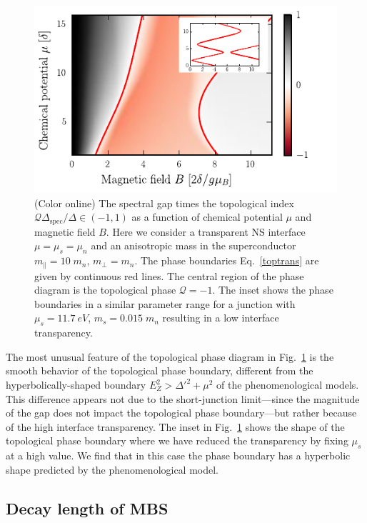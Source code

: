 \begin{figure}
\includegraphics[width=\columnwidth]{chapter_shortjunction/figures/gaps}
\caption{(Color online) The spectral gap times the topological index $\mathcal Q \Delta_\mathrm{spec} /\Delta \in(-1,1)$ as a function of chemical potential $\mu$ and magnetic field $B$.
Here we consider a transparent NS interface $\mu=\mu_s=\mu_n$ and an anisotropic mass in the superconductor $m_\parallel=10\;m_n$, $m_\perp = m_n$.
The phase boundaries Eq.~\eqref{toptrans} are given by continuous red lines.
The central region of the phase diagram is the topological phase $\mathcal Q=-1$.
The inset shows the phase boundaries in a similar parameter range for a junction with $\mu_s=\SI{11.7}{eV}$, $m_s=0.015\;m_n$ resulting in a low interface transparency.
}
\label{fig:gaps}
\end{figure}

The most unusual feature of the topological phase diagram in Fig.~\ref{fig:gaps} is the smooth behavior of the topological phase boundary, different from the hyperbolically-shaped boundary $E_Z^2 > \Delta'^2 + \mu^2$ of the phenomenological models\cite{Lutchyn2010,Oreg2010,Lutchyn2011}.
This difference appears not due to the short-junction limit---since the magnitude of the gap does not impact the topological phase boundary---but rather because of the high interface transparency.
The inset in Fig.~\ref{fig:gaps} shows the shape of the topological phase boundary where we have reduced the transparency by fixing $\mu_s$ at a high value.
We find that in this case the phase boundary has a hyperbolic shape predicted by the phenomenological model.

\subsection{Decay length of MBS}

